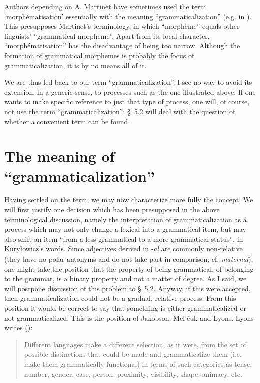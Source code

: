 Authors depending on A. Martinet have sometimes used the term ‘morphématisation’ essentially with the meaning ``grammaticalization'' (e.g. in \citet[1064f]{Martinet1968}). This presupposes Martinet's terminology, in which ``morphème'' equals other linguists' ``grammatical morpheme''. Apart from its local character, ``morphématisation'' has the disadvantage of being too narrow. Although the formation of grammatical morphemes is probably the focus of grammaticalization, it is by no means all of it.

We are thus led back to our term ``grammaticalization''. I see no way to avoid its extension, in a generic sense, to processes such as the one illustrated above. If one wants to make specific reference to just that type of process, one will, of course, not use the term ``grammaticalization''; §~5.2 will deal with the question of whether a convenient term can be found.

\section{The meaning of ``grammaticalization''} \label{sec:2.2}

Having settled on the term, we may now characterize more fully the concept. We will first justify one decision which has been presupposed in the above terminological discussion, namely the interpretation of grammaticalization as a process which may not only change a lexical into a grammatical item, but may also shift an item “from a less grammatical to a more grammatical status”, in Kuryłowicz's words. Since adjectives derived in -\textit{al} are commonly non-relative (they have no polar antonyms and do not take part in comparison; cf. \textit{maternal}), one might take the position that the property of being grammatical, of belonging to the grammar, is a binary property and not a matter of degree. As I said, we will postpone discussion of this problem to §~5.2. Anyway, if this were accepted, then grammaticalization could not be a gradual, relative process. From this position it would be correct to say that something is either grammaticalized or not grammaticalized. This is the position of Jakobson, Mel'čuk and Lyons. Lyons writes (\citeyear[234]{Lyons1977}):

\begin{quote}
Different languages make a different selection, as it were, from the set of possible distinctions that could be made and grammaticalize them (i.e. make them grammatically functional) in terms of such categories as tense, number, gender, case, person, proximity, visibility, shape, animacy, etc.
\end{quote}


